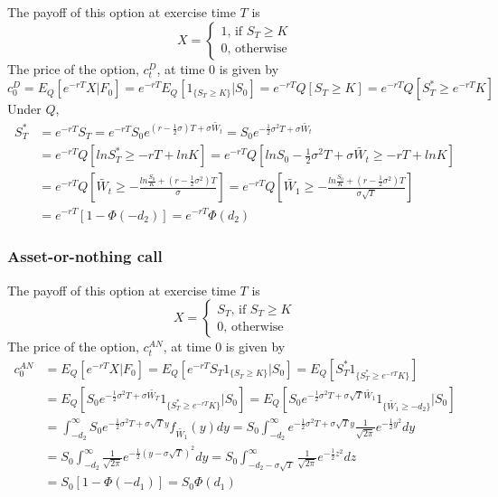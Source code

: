\documentclass[11pt,a4paper]{book}
\theoremstyle{definition}\newtheorem{definition}{Definition}
\theoremstyle{definition}\newtheorem{fact}{Fact}
\theoremstyle{definition}\newtheorem{remark}{Remark}
\theoremstyle{definition}\newtheorem{ex}{Ex.}
\theoremstyle{definition}\newtheorem{project}{Project}
\theoremstyle{definition}\newtheorem{problem}{Problem}
\theoremstyle{definition}\newtheorem{example}{Example}
\numberwithin{theorem}{section}
\numberwithin{corollary}{chapter}
\numberwithin{assumption}{chapter}
\numberwithin{definition}{chapter}
\numberwithin{prop}{chapter}
\numberwithin{notation}{chapter}
\numberwithin{problem}{chapter}
\numberwithin{example}{chapter}
\numberwithin{fact}{chapter}
\numberwithin{ex}{chapter}
\begin{document}
The payoff of this option at exercise time $T$ is
$$ X = \begin{cases}
1 \text{,          if } S_T \geq K \\
0 \text{,          otherwise}
\end{cases} $$
The price of the option, $c_t^D$, at time 0 is given by
$$ c_0^D = E_Q[e^{-rT}X|F_0] = e^{-rT} E_Q[1_{\{S_T \geq K\}}|S_0] = e^{-rT} Q[S_T \geq K] = e^{-rT} Q[S_T^* \geq e^{-rT} K] $$
Under $Q$,
\begin{align*}
S_T^* &= e^{-rT}S_T = e^{-rT} S_0 e^{(r-\frac{1}{2}\sigma)T + \sigma \tilde{W_t}} = S_0 e^{-\frac{1}{2}\sigma^2 T + \sigma \tilde{W_t}} \\
&= e^{-rT} Q[ln S_T^* \geq -rT + ln K] = e^{-rT} Q[ln S_0 - \frac{1}{2} \sigma^2 T + \sigma \tilde{W_t} \geq -rT + ln K] \\
&= e^{-rT} Q \left[\tilde{W_t} \geq - \frac{ln \frac{S_0}{K} + (r-\frac{1}{2}\sigma^2)T}{\sigma} \right] = e^{-rT} Q \left[\tilde{W_1} \geq - \frac{ln \frac{S_0}{K} + (r-\frac{1}{2}\sigma^2)T}{\sigma \sqrt{T}} \right] \\
&= e^{-rT} [1-\Phi(-d_2)] = e^{-rT} \Phi(d_2)
\end{align*}

\subsubsection*{Asset-or-nothing call}

The payoff of this option at exercise time $T$ is
$$ X = \begin{cases}
S_T \text{,          if } S_T \geq K \\
0 \text{,          otherwise}
\end{cases} $$
The price of the option, $c_t^{AN}$, at time 0 is given by
\begin{align*}
c_0^{AN} &= E_Q[e^{-rT}X|F_0] = E_Q[e^{-rT} S_T 1_{\{S_T \geq K\}}|S_0] = E_Q[S_T^* 1_{\{S_T^* \geq e^{-rT} K\}}] \\
&= E_Q \left [S_0e^{-\frac{1}{2}\sigma^2T + \sigma \tilde{W_T}} 1_{\{S_T^* \geq e^{-rT}K\}}|S_0 \right] = E_Q \left[ S_0e^{-\frac{1}{2}\sigma^2T + \sigma \sqrt{T} \tilde{W_1}} 1_{\{\tilde{W_1} \geq -d_2 \}}|S_0 \right] \\
&= \int_{-d_2}^{\infty} S_0 e^{-\frac{1}{2}\sigma^2 T + \sigma \sqrt{T}y} f_{\tilde{W_1}}(y) dy = S_0 \int_{-d_2}^{\infty} e^{-\frac{1}{2}\sigma^2 T + \sigma \sqrt{T}y} \frac{1}{\sqrt{2\pi}} e^{-\frac{1}{2}y^2} dy \\
&= S_0 \int_{-d_2}^{\infty} \frac{1}{\sqrt{2\pi}} e^{-\frac{1}{2}(y-\sigma \sqrt{T})^2} dy = S_0 \int_{-d_2-\sigma \sqrt{T}}^{\infty} \frac{1}{\sqrt{2\pi}} e^{-\frac{1}{2}z^2} dz \\
&= S_0 [1-\Phi(-d_1)] = S_0 \Phi(d_1)
\end{align*}
\end{document}
